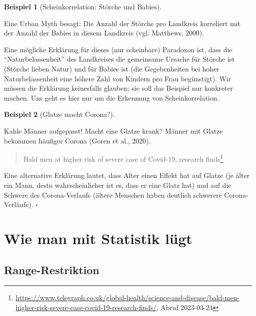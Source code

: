 \documentclass[
  a4paper,
]{scrbook}
\theoremstyle{definition}
\newtheorem{example}{Beispiel}[chapter]
\theoremstyle{definition}
\theoremstyle{definition}
\theoremstyle{remark}
\begin{document}
\begin{example}[Scheinkorrelation: Störche und
Babies]\protect\hypertarget{exm-scheinkorr}{}\label{exm-scheinkorr}

Eine Urban Myth besagt: Die Anzahl der Störche pro Landkreis korreliert
mit der Anzahl der Babies in diesem Landkreis (vgl. Matthews, 2000).

Eine mögliche Erklärung für dieses (nur scheinbare) Paradoxon ist, dass
die ``Naturbelassenheit'' des Landkreises die gemeinsame Ursache für
Störche ist (Störche lieben Natur) und für Babies ist (die Gegebenheiten
bei hoher Naturbelassenheit eine höhere Zahl von Kindern pro Frau
begünstigt). Wir müssen die Erklärung keinesfalls glauben; sie soll das
Beispiel nur konkreter machen. Uns geht es hier nur um die Erkennung von
Scheinkorrelation.

\end{example}

\begin{example}[Glatze macht
Corona?]\protect\hypertarget{exm-corona-glatze}{}\label{exm-corona-glatze}

Kahle Männer aufgepasst! Macht eine Glatze krank? Männer mit Glatze
bekommen häufiger Corona (Goren et al., 2020).

\begin{quote}
Bald men at higher risk of severe case of Covid-19, research
finds\footnote{\url{https://www.telegraph.co.uk/global-health/science-and-disease/bald-men-higher-risk-severe-case-covid-19-research-finds/},
  Abruf 2023-03-24}
\end{quote}

Eine alternative Erklärung lautet, dass Alter einen Effekt hat auf
Glatze (je älter ein Mann, desto wahrscheinlicher ist es, dass er eine
Glatz hat) und auf die Schwere des Corona-Verlaufs (ältere Menschen
haben deutlich schwerere Corona-Verläufe). \(\square\)

\end{example}

\section{Wie man mit Statistik
lügt}\label{wie-man-mit-statistik-luxfcgt-3}

\subsection{Range-Restriktion}\label{range-restriktion}
\end{document}
